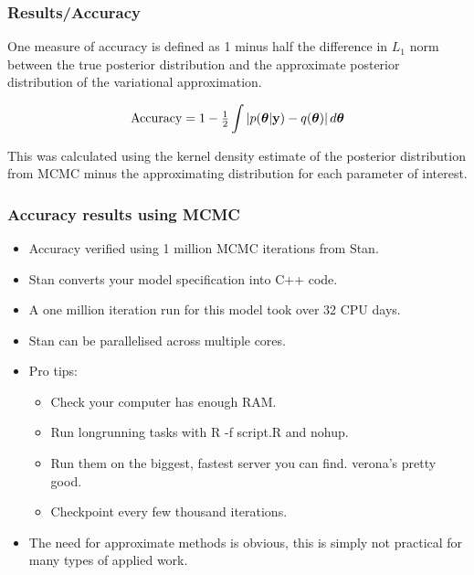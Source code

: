 \documentclass{beamer}
\begin{document}
\begin{frame}
	\frametitle{Results/Accuracy}
	One measure of accuracy is defined as 1 minus half the difference in $L_1$ norm between the
	true posterior distribution and the approximate posterior distribution of the
	variational approximation.
	
	$$
	\text{Accuracy} = 1 - \tfrac{1}{2} \int \left |p({\boldsymbol \theta}|{\bf y}) - q({\boldsymbol \theta}) \right | d {\boldsymbol \theta}
	$$
	
	This was calculated using the kernel density estimate of the posterior
	distribution from MCMC minus the approximating distribution for each parameter of
	interest.
	
\end{frame}

\begin{frame}
	\frametitle{Accuracy results using MCMC}
	\begin{itemize}
		\item Accuracy verified using 1 million MCMC iterations from Stan.
		\item Stan converts your model specification into C++ code.
		\item A one million iteration run for this model took over 32 CPU days.
		\item Stan can be parallelised across multiple cores.
		\item Pro tips:
		      \begin{itemize}
		      	\item Check your computer has enough RAM.
		      	\item Run longrunning tasks with R -f script.R and nohup.
		      	\item Run them on the biggest, fastest server you can find. verona's pretty good.
		      	\item Checkpoint every few thousand iterations.
		      \end{itemize}
		\item The need for approximate methods is obvious, this is simply not
		      practical for many types of applied work.
	\end{itemize}
\end{frame}
\end{document}
